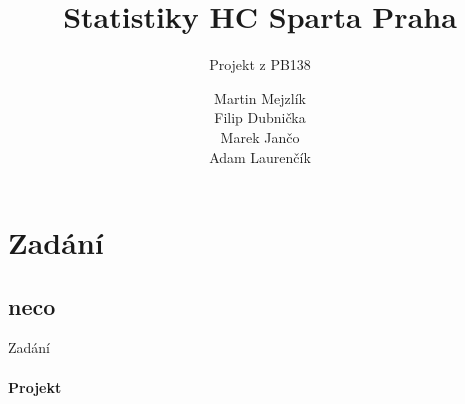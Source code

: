 \documentclass{beamer}
\title{Statistiky HC Sparta Praha} %
\subtitle{Projekt z PB138} %
\author{Martin Mejzlík \\Filip Dubnička \\Marek Jančo \\Adam Laurenčík}
\newcommand{\comment}[1]{}
\begin{document}
  \frame{\maketitle}

  \AtBeginSection[]{%
  
  \comment{
    \begin{frame}<beamer>
      \frametitle{Outline for Section \thesection}
      \tableofcontents[currentsection]
    \end{frame}
    
  }
    }
    


    \section{Zadání}

	\subsection{neco}
	\begin{frame}{Zadání}
	\framesubtitle{Projekt}%
	  
    \end{frame} 		
\end{document}
